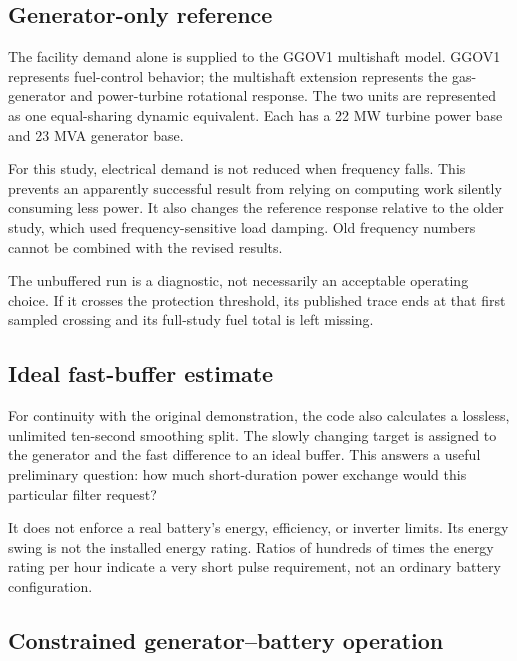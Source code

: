 \documentclass[11pt]{article}
\begin{document}
\subsection{Generator-only reference}

The facility demand alone is supplied to the GGOV1 multishaft model.
GGOV1 represents fuel-control behavior; the multishaft extension represents
the gas-generator and power-turbine rotational response.
The two units are represented as one equal-sharing dynamic equivalent.
Each has a 22 MW turbine power base and 23 MVA generator base.

For this study, electrical demand is not reduced when frequency falls.
This prevents an apparently successful result from relying on computing
work silently consuming less power. It also changes the reference response
relative to the older study, which used frequency-sensitive load damping.
Old frequency numbers cannot be combined with the revised results.

The unbuffered run is a diagnostic, not necessarily an acceptable operating
choice. If it crosses the protection threshold, its published trace ends
at that first sampled crossing and its full-study fuel total is left missing.

\subsection{Ideal fast-buffer estimate}

For continuity with the original demonstration, the code also calculates
a lossless, unlimited ten-second smoothing split. The slowly changing
target is assigned to the generator and the fast difference to an ideal buffer.
This answers a useful preliminary question: how much short-duration
power exchange would this particular filter request?

It does not enforce a real battery's energy, efficiency, or inverter limits.
Its energy swing is not the installed energy rating. Ratios of hundreds
of times the energy rating per hour indicate a very short pulse requirement,
not an ordinary battery configuration.

\subsection{Constrained generator--battery operation}
\end{document}
